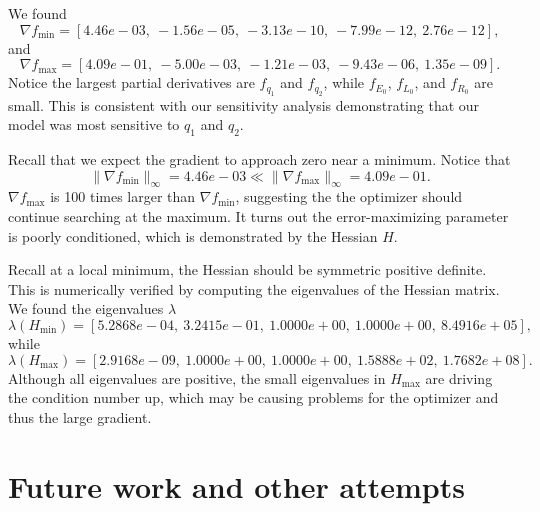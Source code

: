 \documentclass{article}
\begin{document}
We found
$$ \nabla f _{\text{min}} = [4.46e-03,~-1.56e-05,~-3.13e-10,~-7.99e-12,~2.76e-12 ] ,$$ 
and
$$ \nabla f _{\text{max}} = [4.09e-01,~-5.00e-03,~-1.21e-03,~-9.43e-06,~1.35e-09 ] .$$ 
Notice the largest partial derivatives are $f_{q_1}$ and $f_{q_2}$, while $f_{E_0}$, $f_{L_0}$, and $f_{R_0}$ are small.  This is consistent with our sensitivity analysis demonstrating that our model was most sensitive to $q_1$ and $q_2$.

Recall that we expect the gradient to approach zero near a minimum.  Notice that $$\| \nabla f_{\min} \|_\infty = 4.46 e-03 \ll \| \nabla f_{\max} \|_\infty = 4.09 e-01. $$  
$\nabla f_{\max}$ is 100 times larger than $ \nabla f_{\min} $, suggesting the the optimizer should continue searching at the maximum.  It turns out the error-maximizing parameter is poorly conditioned, which is demonstrated by the Hessian $H$.

Recall at a local minimum, the Hessian should be symmetric positive definite.  This is numerically verified by computing the eigenvalues of the Hessian matrix.  We found the eigenvalues $\lambda$
$$ \lambda(H_{\min})  = [5.2868e-04,~ 3.2415e-01,~1.0000e+00,~1.0000e+00,~8.4916e+05],$$ 
while
$$ \lambda(H_{\max})  =   [ 2.9168e-09,~1.0000e+00,~1.0000e+00,~1.5888e+02,~1.7682e+08].$$
Although all eigenvalues are positive, the small eigenvalues in $H_{\max}$ are driving the condition number up, which may be causing problems for the optimizer and thus the large gradient.





	

	
	
	
	
	\section{Future work and other attempts}
	
\end{document}
